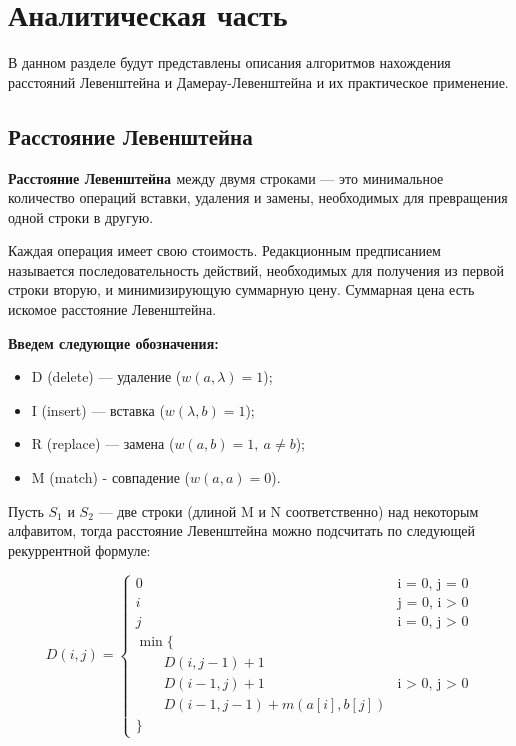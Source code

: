 \chapter{Аналитическая часть}
В данном разделе будут представлены описания алгоритмов нахождения расстояний Левенштейна и Дамерау-Левенштейна и их практическое применение.
\section{Расстояние Левенштейна}

\textbf{Расстояние Левенштейна \cite{Levenshtein}} между двумя строками — это минимальное количество операций вставки, удаления и замены, необходимых для превращения одной строки в другую.

Каждая операция имеет свою стоимость. Редакционным предписанием называется последовательность действий, необходимых для получения из первой строки вторую, и минимизирующую суммарную цену. Суммарная цена есть искомое расстояние Левенштейна.

\textbf{Введем следующие обозначения:} 
\begin{itemize}
	\item D (delete) — удаление ($w(a,\lambda)=1$);
	\item I (insert) — вставка ($w(\lambda,b)=1$);
	\item R (replace) — замена  ($w(a,b)=1, \medspace a \neq b$);
	\item M (match) - совпадение ($w(a,a)=0$).
\end{itemize}

Пусть $S_{1}$ и $S_{2}$ — две строки (длиной M и N соответственно) над некоторым алфавитом, тогда расстояние Левенштейна можно подсчитать по следующей рекуррентной формуле:

\begin{equation}
	\label{eq:D}
	D(i, j) = \begin{cases}
		
		0 &\text{i = 0, j = 0}\\
		i &\text{j = 0, i > 0}\\
		j &\text{i = 0, j > 0}\\
		\min \lbrace \\
		\qquad D(i, j-1) + 1\\
		\qquad D(i-1, j) + 1 &\text{i > 0, j > 0}\\
		\qquad D(i-1, j-1) + m(a[i], b[j]) \\
		\rbrace
	\end{cases}
\end{equation}


